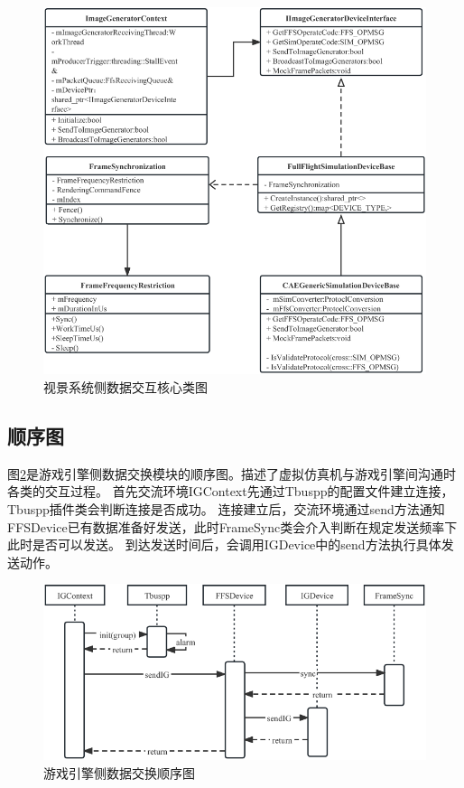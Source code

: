 \begin{figure}[h!]
    \begin{center}
        \includegraphics[width=\textwidth]{pictures/classdiagram3.pdf}
        \caption{视景系统侧数据交互核心类图}
        \label{module32}
    \end{center}
\end{figure}
\subsection{顺序图}
图\ref{seq3}是游戏引擎侧数据交换模块的顺序图。描述了虚拟仿真机与游戏引擎间沟通时各类的交互过程。
首先交流环境IGContext先通过Tbuspp的配置文件建立连接，Tbuspp插件类会判断连接是否成功。
连接建立后，交流环境通过send方法通知FFSDevice已有数据准备好发送，此时FrameSync类会介入判断在规定发送频率下此时是否可以发送。
到达发送时间后，会调用IGDevice中的send方法执行具体发送动作。
\begin{figure}[h!]
    \begin{center}
        \includegraphics[width=\textwidth]{pictures/sequence3.pdf}
        \caption{游戏引擎侧数据交换顺序图}
        \label{seq3}
    \end{center}
\end{figure}
